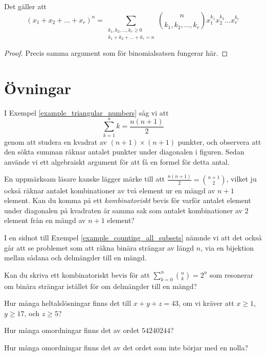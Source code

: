 \documentclass[nobib]{tufte-handout}
\begin{document}
\begin{theorem}[Multinomialsatsen]
  Det gäller att
  $$(x_1 + x_2 + \ldots + x_r)^n = \sum_{\substack{k_1, k_2, \ldots, k_r \geq 0\\k_1 + k_2 + \ldots + k_r = n}} \binom{n}{k_1, k_2, \ldots, k_r} x_1^{k_1} x_2^{k_2} \ldots x_r^{k_r}$$

  \begin{proof}
    Precis samma argument som för binomialsatsen fungerar här.
  \end{proof}
\end{theorem}

\section{Övningar}

\begin{xca}
  I Exempel \ref{example_triangular_numbers} såg vi att
  $$\sum_{k=1}^n k = \frac{n(n+1)}{2}$$
  genom att studera en kvadrat av $(n+1)\times(n+1)$ punkter, och observera att den sökta summan räknar antalet punkter under diagonalen i figuren. Sedan använde vi ett algebraiskt argument för att få en formel för detta antal.

  En uppmärksam läsare kanske lägger märke till att $\frac{n(n+1)}{2} = \binom{n+1}{2}$, vilket ju också räknar antalet kombinationer av två element ur en mängd av $n+1$ element. Kan du komma på ett \emph{kombinatoriskt} bevis för varför antalet element under diagonalen på kvadraten är samma sak som antalet kombinationer av $2$ element från en mängd av $n+1$ element?
\end{xca}

\begin{xca}
  I en sidnot till Exempel \ref{example_counting_all_subsets} nämnde vi att det också går att se problemet som att räkna binära strängar av längd $n$, via en bijektion mellan sådana och delmängder till en mängd.

  Kan du skriva ett kombinatoriskt bevis för att $\sum_{k=0}^n \binom{n}{k} = 2^n$ som resonerar om binära strängar istället för om delmängder till en mängd?
\end{xca}

\begin{xca}
  Hur många heltalslösningar finns det till $x + y + z = 43$, om vi kräver att $x \geq 1$, $y \geq 17$, och $z \geq 5$?
\end{xca}

\begin{xca}
  Hur många omordningar finns det av ordet $54240244$?

  Hur många omordningar finns det av det ordet som inte börjar med en nolla?
\end{xca}
\end{document}
